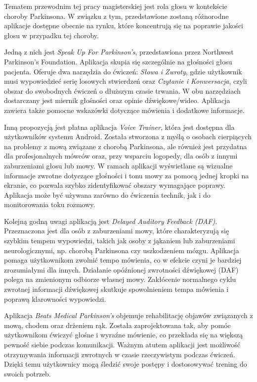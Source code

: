 Tematem przewodnim tej pracy magisterskiej jest rola głosu w kontekście choroby Parkinsona. W związku z tym, przedstawione
zostaną różnorodne aplikacje dostępne obecnie na rynku, które koncentrują się na poprawie jakości głosu w przypadku tej choroby.

Jedną z nich jest \emph{Speak Up For Parkinson's}, przedstawiona przez Northwest Parkinson's Foundation.
Aplikacja skupia się szczególnie na głośności głosu pacjenta.
Oferuje dwa narzędzia do ćwiczeń: \emph{Słowa i Zwroty}, gdzie użytkownik musi wypowiedzieć serię losowych stwierdzeń oraz \emph{Czytanie i Konwersacja}, czyli obszar do swobodnych ćwiczeń o dłuższym czasie trwania.
W obu narzędziach dostarczany jest miernik głośności oraz opinie dźwiękowe/wideo.
Aplikacja zawiera także pomocne wskazówki dotyczące mówienia i dodatkowe informacje.

Inną propozycją jest płatna aplikacja \emph{Voice Trainer}, która jest dostępna dla użytkowników systemu Android.
Została stworzona z myślą o osobach cierpiących na problemy z mową związane z chorobą Parkinsona, ale również jest przydatna dla profesjonalnych mówców oraz, przy wsparciu logopedy, dla osób z innymi zaburzeniami głosu lub mowy.
W ramach aplikacji wyświetlane są wizualne informacje zwrotne dotyczące głośności i tonu mowy za pomocą jednej kropki na ekranie, co pozwala szybko
zidentyfikować obszary wymagające poprawy.
Aplikacja może być używana zarówno do ćwiczenia technik, jak i do monitorowania toku rozmowy.

Kolejną godną uwagi aplikacją jest \emph{Delayed Auditory Feedback (DAF)}.
Przeznaczona jest dla osób z zaburzeniami mowy, które charakteryzują się szybkim tempem wypowiedzi, takich jak osoby z jąkaniem lub zaburzeniami neurologicznymi, np. chorobą Parkinsona czy uszkodzeniem mózgu.
Aplikacja pomaga użytkownikom zwolnić tempo mówienia, co w efekcie czyni je bardziej zrozumiałymi dla innych.
Działanie opóźnionej zwrotności dźwiękowej (DAF) polega na zmienionym odbiorze własnej mowy.
Zakłócenie normalnego cyklu zwrotnej informacji dźwiękowej skutkuje spowolnieniem tempa mówienia i poprawą klarowności wypowiedzi.

Aplikacja \emph{Beats Medical Parkinson's} objemuje rehabilitację objawów związanych z mową, chodem oraz drżeniem rąk.
Została zaprojektowana tak, aby pomóc użytkownikom ćwiczyć głośne i wyraźne mówienie, co przekłada się na większą pewność siebie podczas komunikacji.
Ważnym atutem aplikacji jest możliwość otrzymywania informacji zwrotnych w czasie rzeczywistym podczas ćwiczeń.
Dzięki temu użytkownicy mogą śledzić swoje postępy i dostosowywać trening do swoich potrzeb.

